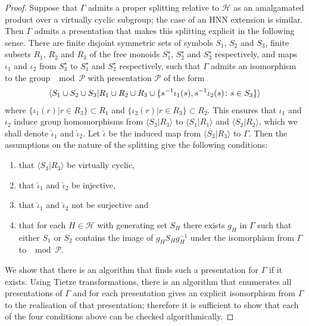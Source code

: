 \begin{proof} Suppose that $\Gamma$ admits a proper splitting relative to
  $\mathcal{H}$ as an amalgamated product over a virtually cyclic subgroup; the
  case of an HNN extension is similar. Then $\Gamma$ admits a presentation that
  makes this splitting explicit in the following sense. There are finite
  disjoint symmetric sets of symbols $S_1$, $S_2$ and $S_3$, finite subsets
  $R_1$, $R_2$ and $R_3$ of the free monoids $S_1^\star$, $S_2^\star$ and
  $S_3^\star$ respectively, and maps $\iota_1$ and $\iota_2$ from $S_3^\star$
  to $S_1^\star$ and $S_2^\star$ respectively, such that $\Gamma$ admits an
  isomorphism to the group $\mod{\mathcal{P}}$ with presentation $\mathcal{P}$ of the form
\begin{align*}
  \langle S_1 \cup S_2 \cup S_3 \vert R_1 \cup R_2 \cup R_3 \cup
    \{s^{-1}\iota_1(s), s^{-1}\iota_2(s) \colon s \in S_3\}\rangle
\end{align*}
where $\{\iota_1(r) \vert r \in R_3\} \subset R_1$ and $\{\iota_2(r) \vert r
\in R_3\} \subset R_2$. This ensures that $\iota_1$ and $\iota_2$ induce group
homomorphisms from $\langle S_3 \vert R_3\rangle$ to $\langle S_1 \vert
R_1\rangle$ and  $\langle S_2 \vert R_2\rangle$, which we shall denote
$\widehat\iota_1$ and $\widehat\iota_2$. Let $\widehat\iota$ be the induced map from
$\langle S_3 \vert R_3\rangle$ to $\Gamma$. Then the assumptions on the nature
of the splitting give the following conditions:
\begin{enumerate}
\item that $\langle S_3 \vert R_3 \rangle$ be virtually cyclic,
\item that $\widehat\iota_1$ and $\widehat\iota_2$ be injective,
\item that $\widehat\iota_1$ and $\widehat\iota_2$ not be surjective and
\item that for each $H \in \mathcal{H}$ with generating set $S_H$ there exists
  $g_H$ in $\Gamma$ such that either $S_1$ or $S_2$ contains the image of
  $g_HS_Hg_H^{-1}$ under the isomorphism from $\Gamma$ to $\mod{\mathcal{P}}$.
\end{enumerate}

We show that there is an algorithm that finds such a presentation for
$\Gamma$ if it exists. Using Tietze transformations, there is an algorithm that
enumerates all presentations of $\Gamma$ and for each presentation gives an
explicit isomorphism from $\Gamma$ to the realisation of that presentation;
therefore it is sufficient to show that each of the four conditions above can
be checked algorithmically.


\end{proof}
